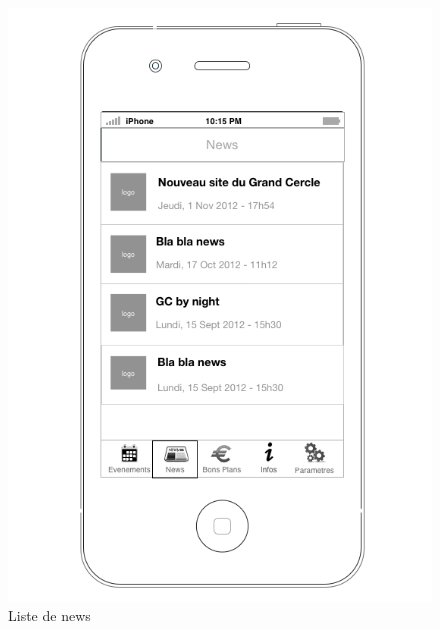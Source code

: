 \documentclass[a4paper, 11pt]{article}
\begin{document}
\begin{figure}[h!]
	\begin{minipage}[c]{.50\linewidth}
		\begin{center}
			\includegraphics[scale=0.3]{../../Sketch/iOS/news_liste.png}
		\end{center}
	\caption{Liste de news}


\end{minipage}
\end{figure}
\end{document}
